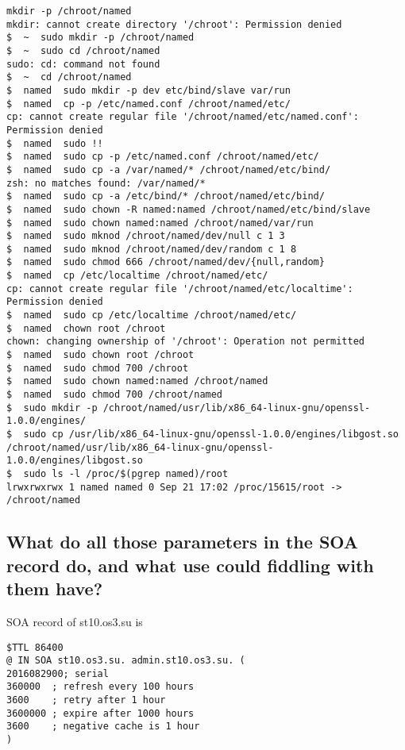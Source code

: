 \documentclass[a4paper,11pt]{article}
\begin{document}
\begin{lstlisting}
mkdir -p /chroot/named
mkdir: cannot create directory '/chroot': Permission denied
$  ~  sudo mkdir -p /chroot/named
$  ~  sudo cd /chroot/named
sudo: cd: command not found
$  ~  cd /chroot/named
$  named  sudo mkdir -p dev etc/bind/slave var/run
$  named  cp -p /etc/named.conf /chroot/named/etc/
cp: cannot create regular file '/chroot/named/etc/named.conf': Permission denied
$  named  sudo !!
$  named  sudo cp -p /etc/named.conf /chroot/named/etc/
$  named  sudo cp -a /var/named/* /chroot/named/etc/bind/
zsh: no matches found: /var/named/*
$  named  sudo cp -a /etc/bind/* /chroot/named/etc/bind/
$  named  sudo chown -R named:named /chroot/named/etc/bind/slave
$  named  sudo chown named:named /chroot/named/var/run
$  named  sudo mknod /chroot/named/dev/null c 1 3
$  named  sudo mknod /chroot/named/dev/random c 1 8
$  named  sudo chmod 666 /chroot/named/dev/{null,random}
$  named  cp /etc/localtime /chroot/named/etc/
cp: cannot create regular file '/chroot/named/etc/localtime': Permission denied
$  named  sudo cp /etc/localtime /chroot/named/etc/
$  named  chown root /chroot
chown: changing ownership of '/chroot': Operation not permitted
$  named  sudo chown root /chroot
$  named  sudo chmod 700 /chroot
$  named  sudo chown named:named /chroot/named
$  named  sudo chmod 700 /chroot/named
$  sudo mkdir -p /chroot/named/usr/lib/x86_64-linux-gnu/openssl-1.0.0/engines/
$  sudo cp /usr/lib/x86_64-linux-gnu/openssl-1.0.0/engines/libgost.so /chroot/named/usr/lib/x86_64-linux-gnu/openssl-1.0.0/engines/libgost.so
$  sudo ls -l /proc/$(pgrep named)/root
lrwxrwxrwx 1 named named 0 Sep 21 17:02 /proc/15615/root -> /chroot/named
\end{lstlisting}

\subsection{What do all those parameters in the SOA record do, and what use could fiddling with them have?}

SOA record of st10.os3.su is

\begin{lstlisting}
$TTL 86400
@ IN SOA st10.os3.su. admin.st10.os3.su. (
2016082900; serial
360000  ; refresh every 100 hours
3600    ; retry after 1 hour
3600000 ; expire after 1000 hours
3600    ; negative cache is 1 hour
)
\end{lstlisting}
\end{document}

